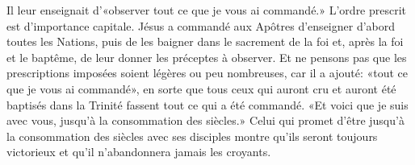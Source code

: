 Il leur enseignait d’«observer tout ce que je vous ai commandé.»
L’ordre prescrit est d’importance capitale.
Jésus a commandé aux Apôtres d’enseigner d’abord toutes les Nations,
	puis de les baigner dans le sacrement de la foi
	et, après la foi et le baptême, de leur donner les préceptes à observer.
Et ne pensons pas
		que les prescriptions imposées soient légères ou peu nombreuses,
	car il a ajouté: «tout ce que je vous ai commandé»,
	en sorte que tous ceux qui auront cru et auront été baptisés dans la Trinité
	fassent tout ce qui a été commandé.
«Et voici que je suis avec vous, jusqu’à la consommation des siècles.»
Celui qui promet d’être jusqu’à la consommation des siècles avec ses disciples
	montre qu’ils seront toujours victorieux
	et qu’il n’abandonnera jamais les croyants.
